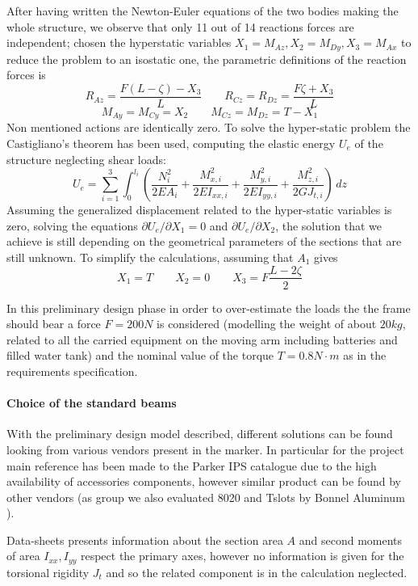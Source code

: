 	After having written the Newton-Euler equations of the two bodies making the whole structure, we observe that only 11 out of 14 reactions forces are independent; chosen the hyperstatic variables $X_1 = M_{Az},X_2 = M_{Dy}, X_3 = M_{Ax}$ to reduce the problem to an isostatic one, the parametric definitions of the reaction forces is
	\[ R_{Az} = \frac{F (L-\zeta) - X_3}{L} \qquad R_{Cz} = R_{Dz} =\frac{F\zeta + X_3}{L} \] \[ M_{Ay} = M_{Cy} = X_2 \qquad M_{Cz} = M_{Dz} = T-X_1 \]
	Non mentioned actions are identically zero. To solve the hyper-static problem the Castigliano's theorem has been used, computing the elastic energy $U_e$ of the structure neglecting shear loads:
	\[ U_e = \sum_{i=1}^3 \int_0 ^{l_i}  \left( \frac{N_i^2}{2EA_i} + \frac{M_{x,i}^2}{2 EI_{xx,i}} + \frac{M_{y,i}^2}{2 E I_{yy,i}} + \frac{M_{z,i}^2}{2G J_{t,i}}  \right)\, dz \]
	Assuming the generalized displacement related to the hyper-static variables is zero, solving the equations $\partial U_e / \partial X_1 = 0$ and $\partial U_e/\partial X_2$, the solution that we achieve is still depending on the geometrical parameters of the sections that are still unknown. To simplify the calculations, assuming that $A_1$ gives
	\[ X_1 = T \qquad X_2 = 0 \qquad X_3 = F \frac{L-2\zeta}{2} \]
	
	
	In this preliminary design phase in order to over-estimate the loads the the frame should bear a force $F = 200 N$ is considered (modelling the weight of about $20kg$, related to all the carried equipment on the moving arm including batteries and filled water tank) and the nominal value of the torque $T = 0.8 N\cdot m$ as in the requirements specification.
	
	\paragraph{Choice of the standard beams} With the preliminary design model described, different solutions can be found looking from various vendors present in the marker. In particular for the project main reference has been made to the Parker IPS catalogue \cite{parker-ds} due to the high availability of accessories components, however similar product can be found by other vendors (as group we also evaluated 8020 \cite{8020-ds} and Tslots by Bonnel Aluminum \cite{tslot-ds}).
	
	Data-sheets presents information about the section area $A$ and second moments of area $I_{xx},I_{yy}$ respect the primary axes, however no information is given for the torsional rigidity $J_t$ and so the related component is in the calculation neglected. 
	

